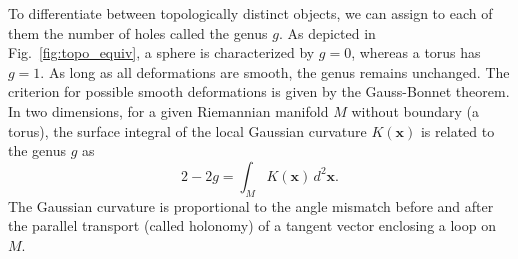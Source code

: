 To differentiate between topologically distinct objects, we can assign to each of them the number of holes called the genus $g$. As depicted in Fig.~\ref{fig:topo_equiv}, a sphere is characterized by $g =0$, whereas a torus has $g = 1$. As long as all deformations are smooth, the genus remains unchanged. The criterion for possible smooth deformations is given by the Gauss-Bonnet theorem. In two dimensions, for a given Riemannian manifold $M$ without boundary (\eg a torus), the surface integral of the local Gaussian curvature $K(\mathbf{x})$ is related to the genus $g$ as
\begin{equation}
2 - 2g = \int_{M} K( \mathbf{x}) \, d^2 \mathbf{x}.
\label{eq:gaussbonnet}
\end{equation}
The Gaussian curvature is proportional to the angle mismatch before and after the parallel transport (called holonomy) of a tangent vector enclosing a loop on $M$. 

